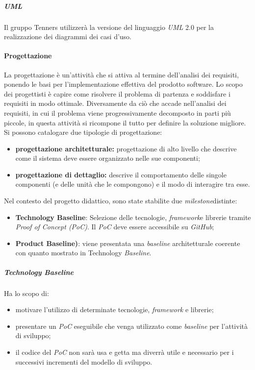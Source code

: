 \subparagraph*{UML\glo}
Il gruppo Tenners utilizzerà la versione del linguaggio \textit{UML\glo} 2.0 per la realizzazione dei diagrammi dei casi d'uso.
\paragraph{Progettazione}
La progettazione è un'attività che si attiva al termine dell'analisi dei requisiti, ponendo le basi per l'implementazione effettiva del prodotto software. Lo scopo dei progettisti è capire come risolvere il problema di partenza e soddisfare i requisiti in modo ottimale. Diversamente da ciò che accade nell'analisi dei requisiti, in cui il problema viene progressivamente decomposto in parti più piccole, in questa attività si ricompone il tutto per definire la soluzione migliore. Si possono catalogare due tipologie di progettazione:
\begin{itemize}
	\item \textbf{progettazione architetturale:} progettazione di alto livello che descrive come il sistema deve essere organizzato nelle sue componenti;
	\item \textbf{progettazione di dettaglio:} descrive il comportamento delle singole componenti (e delle unità che le compongono) e il modo di interagire tra esse.
\end{itemize}
Nel contesto del progetto didattico, sono state stabilite due \textit{milestone}\glo distinte:
\begin{itemize}
	\item \textbf{Technology Baseline\glos}: Selezione delle tecnologie, \textit{framework}\glo e librerie tramite \textit{Proof of Concept (PoC)\glos}. Il \textit{PoC\glo} deve essere accessibile su \textit{GitHub\glos};
	\item \textbf{Product Baseline)\glos}: viene presentata una \textit{baseline\glo} architetturale coerente con quanto mostrato in Technology \textit{Baseline\glos}.
\end{itemize}
\subparagraph*{Technology Baseline\glo}
Ha lo scopo di:
\begin{itemize}
	\item motivare l'utilizzo di determinate tecnologie, \textit{framework\glo} e librerie;
	\item presentare un \textit{PoC\glo} eseguibile che venga utilizzato come \textit{baseline\glo} per l'attività di sviluppo;
	\item il codice del \textit{PoC\glo} non sarà usa e getta ma diverrà utile e necessario per i successivi incrementi del modello di sviluppo.
\end{itemize}
